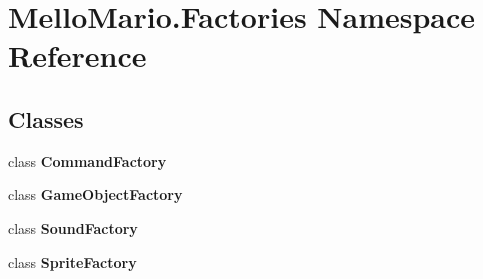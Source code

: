 \section{Mello\+Mario.\+Factories Namespace Reference}
\label{namespaceMelloMario_1_1Factories}
\subsection*{Classes}
\begin{DoxyCompactItemize}
\item 
class \textbf{ Command\+Factory}
\item 
class \textbf{ Game\+Object\+Factory}
\item 
class \textbf{ Sound\+Factory}
\item 
class \textbf{ Sprite\+Factory}
\end{DoxyCompactItemize}
